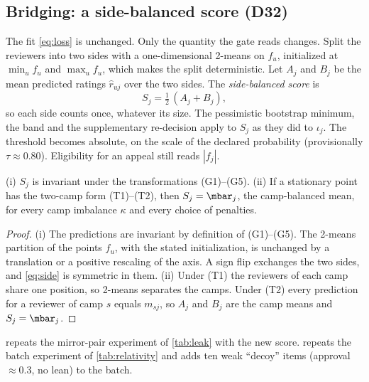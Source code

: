 \subsection{Bridging: a side-balanced score (D32)}

The fit \eqref{eq:loss} is unchanged. Only the quantity the gate reads changes. Split the
reviewers into two sides with a one-dimensional 2-means on $f_u$, initialized at
$\min_uf_u$ and $\max_uf_u$, which makes the split deterministic. Let $A_j$ and $B_j$ be the mean
predicted ratings $\hat r_{uj}$ over the two sides. The \emph{side-balanced score} is
\begin{equation}\label{eq:side}
  S_j=\tfrac12\,(A_j+B_j),
\end{equation}
so each side counts once, whatever its size. The pessimistic bootstrap minimum, the band and the
supplementary re-decision apply to $S_j$ as they did to $\iota_j$. The threshold becomes absolute,
on the scale of the declared probability (provisionally $\tau\approx0.80$). Eligibility for an
appeal still reads $|f_j|$.

\begin{proposition}\label{prop:side}\proved{}
(i) $S_j$ is invariant under the transformations (G1)--(G5). (ii) If a stationary point has the
two-camp form (T1)--(T2), then $S_j=\mbar_j$, the camp-balanced mean, for every camp imbalance
$\kappa$ and every choice of penalties.
\end{proposition}
\begin{proof}
(i) The predictions are invariant by definition of (G1)--(G5). The 2-means partition of the
points $f_u$, with the stated initialization, is unchanged by a translation or a positive
rescaling of the axis. A sign flip exchanges the two sides, and \eqref{eq:side} is symmetric in
them. (ii) Under (T1) the reviewers of each camp share one position, so 2-means separates the
camps. Under (T2) every prediction for a reviewer of camp $s$ equals $m_{sj}$, so $A_j$ and $B_j$
are the camp means and $S_j=\mbar_j$.
\end{proof}

 repeats the mirror-pair experiment of \cref{tab:leak} with the new score.
 repeats the batch experiment of \cref{tab:relativity} and adds ten weak
``decoy'' items (approval $\approx0.3$, no lean) to the batch.

